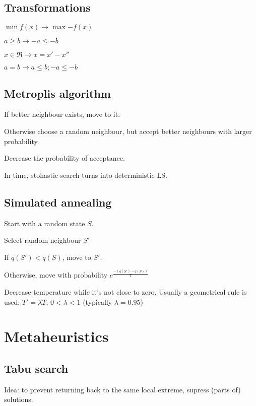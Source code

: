 \documentclass[a4paper]{article}
\begin{document}
\begin{multicols*}{2}
{\subsection{Transformations}
\begin{compactitem}
	\item $\min{f(x)} \rightarrow \max{-f(x)}$
	\item $a \geq b \rightarrow -a \leq -b$
	\item $x \in \Re \rightarrow x = x' - x''$
	\item $a = b \rightarrow a \leq b; -a \leq -b$
\end{compactitem}

\subsection{Metroplis algorithm}
\begin{compactitem}
	\item If better neighbour exists, move to it.
	\item Otherwise choose a random neighbour, but accept better neighbours with larger probability.
	\item Decrease the probability of acceptance.
	\item In time, stohastic search turns into deterministic LS.
\end{compactitem}
\subsection{Simulated annealing}
\begin{compactitem}
	\item Start with a random state $S$.
	\item Select random neighbour $S\prime$
	\item If $q(S\prime) < q(S)$, move to $S\prime$.
	\item Otherwise, move with probability $e^\frac{-(q(S\prime)-q(S))}{T}$
\end{compactitem}
Decrease temperature while it's not close to zero.
Usually a geometrical rule is used: $T\prime = \lambda T$, $0<\lambda<1$ (typically $\lambda = 0.95$)
\section{Metaheuristics}
\subsection{Tabu search}
Idea: to prevent returning back to the same local extreme, supress (parts of) solutions.
}
\end{multicols*}
\end{document}
